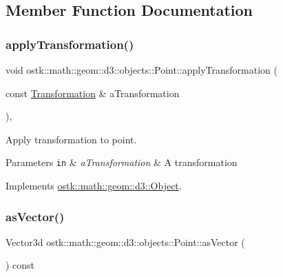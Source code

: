 \subsection{Member Function Documentation}
\mbox{\label{classostk_1_1math_1_1geom_1_1d3_1_1objects_1_1_point_a0b79a5726ac04f814b8a5b737daf0028}} 
\subsubsection{\texorpdfstring{apply\+Transformation()}{applyTransformation()}}
{\footnotesize\ttfamily void ostk\+::math\+::geom\+::d3\+::objects\+::\+Point\+::apply\+Transformation (\begin{DoxyParamCaption}\item[{const \hyperlink{classostk_1_1math_1_1geom_1_1d3_1_1_transformation}{Transformation} \&}]{a\+Transformation }\end{DoxyParamCaption})\hspace{0.3cm}{\ttfamily [override]}, {\ttfamily [virtual]}}



Apply transformation to point. 


\begin{DoxyParams}[1]{Parameters}
\mbox{\tt in}  & {\em a\+Transformation} & A transformation \\
\hline
\end{DoxyParams}


Implements \hyperlink{classostk_1_1math_1_1geom_1_1d3_1_1_object_ae9194dd6d2bb4df09292ffc84dccdb1d}{ostk\+::math\+::geom\+::d3\+::\+Object}.

\mbox{\label{classostk_1_1math_1_1geom_1_1d3_1_1objects_1_1_point_a00034296a5aab3bcc8c4fe46584f119a}} 
\subsubsection{\texorpdfstring{as\+Vector()}{asVector()}}
{\footnotesize\ttfamily Vector3d ostk\+::math\+::geom\+::d3\+::objects\+::\+Point\+::as\+Vector (\begin{DoxyParamCaption}{ }\end{DoxyParamCaption}) const}



